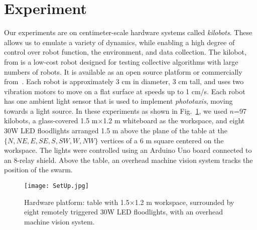 
\section{Experiment}\label{sec:expResults}





Our experiments are on centimeter-scale hardware systems called \emph{kilobots}.  These allows us to emulate a variety of dynamics, while enabling a high degree of control over robot function, the environment, and data collection. The kilobot, from \cite{Rubenstein2012,rubenstein2014programmable} is a low-cost robot designed for testing collective algorithms with large numbers of robots. It is available as an open source platform or commercially from~\cite{K-Team2015}.  Each robot is approximately 3 cm in diameter, 3 cm tall, and uses two vibration motors to move on a flat surface at speeds up to 1 cm/s.  Each robot has one ambient light sensor that is used to implement \emph{phototaxis},  moving towards a light source. 
In these experiments as shown in Fig.~\ref{fig:setup}, we used $n$=97 kilobots, a glass-covered 1.5 m$\times$1.2 m whiteboard as the workspace, and eight 30W LED floodlights arranged 1.5 m above the plane of the table at the $\{N,NE,E,SE,S,SW,W,NW\}$ vertices of a 6 m square centered on the workspace. The lights were controlled using an Arduino Uno board connected to an 8-relay shield.  Above  the table, an overhead machine vision system tracks the position of the swarm.


\begin{figure}
\begin{center}
	\texttt{[image: SetUp.jpg]}
\end{center}
\vspace{-1em}
\caption{\label{fig:setup}
Hardware platform:  table with 1.5$\times$1.2 m workspace, surrounded by eight remotely triggered 30W LED floodlights, with an overhead machine vision system.
}
\vspace{-1em}
\end{figure}





